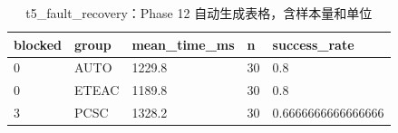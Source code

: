 \begin{table}[htbp]
\centering
\caption{t5_fault_recovery：Phase 12 自动生成表格，含样本量和单位}
\begin{tabular}{lllll}
\hline
blocked & group & mean_time_ms & n & success_rate \\
\hline
0 & AUTO & 1229.8 & 30 & 0.8 \\
0 & ETEAC & 1189.8 & 30 & 0.8 \\
3 & PCSC & 1328.2 & 30 & 0.6666666666666666 \\
\hline
\end{tabular}
\end{table}
